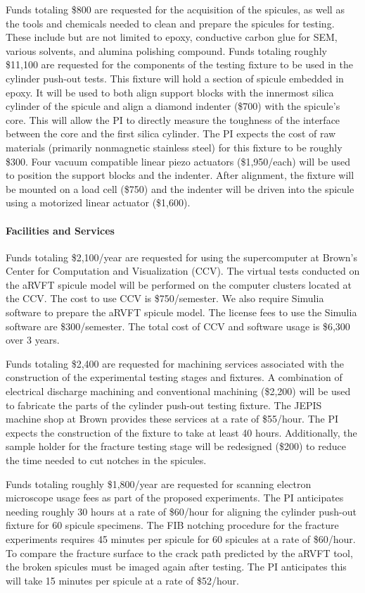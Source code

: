 \documentclass[10pt,letterpaper]{article}
\begin{document}
Funds totaling \$800 are requested for the acquisition of the spicules, as well as the tools and chemicals needed to clean and prepare the spicules for testing. These include but are not limited to epoxy, conductive carbon glue for SEM, various solvents, and alumina polishing compound. Funds totaling roughly \$11,100 are requested for the components of the testing fixture to be used in the cylinder push-out tests. This fixture will hold a section of spicule embedded in epoxy. It will be used to both align support blocks with the innermost silica cylinder of the spicule and align a diamond indenter (\$700) with the spicule's core. This will allow the PI to directly measure the toughness of the interface between the core and the first silica cylinder. The PI expects the cost of raw materials (primarily nonmagnetic stainless steel) for this fixture to be roughly \$300. Four vacuum compatible linear piezo actuators (\$1,950/each) will be used to position the support blocks and the indenter. After alignment, the fixture will be mounted on a load cell (\$750) and the indenter will be driven into the spicule using a motorized linear actuator (\$1,600).

\paragraph{Facilities and Services}
Funds totaling \$2,100/year are requested for using the supercomputer at Brown's Center for Computation and Visualization (CCV). The virtual tests conducted on the aRVFT spicule model will be performed on the computer clusters located at the CCV. The cost to use CCV is \$750/semester. We also require Simulia software to prepare the aRVFT spicule model. The license fees to use the Simulia software are \$300/semester. The total cost of CCV and software usage is \$6,300 over 3 years. 

Funds totaling \$2,400 are requested for machining services associated with the construction of the experimental testing stages and fixtures. A combination of electrical discharge machining and conventional machining (\$2,200) will be used to fabricate the parts of the cylinder push-out testing fixture. The JEPIS machine shop at Brown provides these services at a rate of \$55/hour. The PI expects the construction of the fixture to take at least 40 hours. Additionally, the sample holder for the fracture testing stage will be redesigned (\$200) to reduce the time needed to cut notches in the spicules. 

Funds totaling roughly \$1,800/year are requested for scanning electron microscope usage fees as part of the proposed experiments. The PI anticipates needing roughly 30 hours at a rate of \$60/hour for aligning the cylinder push-out fixture for 60 spicule specimens. The FIB notching procedure for the fracture experiments requires 45 minutes per spicule for 60 spicules at a rate of \$60/hour. To compare the fracture surface to the crack path predicted by the aRVFT tool, the broken spicules must be imaged again after testing. The PI anticipates this will take 15 minutes per spicule at a rate of \$52/hour.
\end{document}
